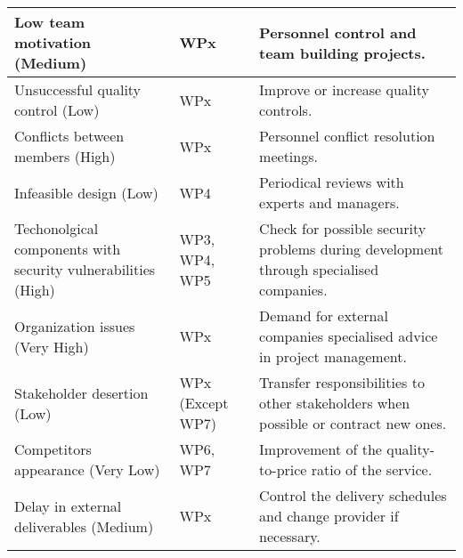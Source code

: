 \begin{longtable}[H]{>{\raggedright\arraybackslash}p{4cm} p{4.7cm} p{5cm}}
	Low team motivation (Medium) & WPx & Personnel control and team building projects. \vspace{0.2cm} \\
	
	\midrule
	
	Unsuccessful quality control (Low) & WPx & Improve or increase quality controls. \vspace{0.2cm} \\
	
	\midrule
	
	Conflicts between members  (High) & WPx & Personnel conflict resolution meetings. \vspace{0.2cm} \\
	
	\midrule
	
	Infeasible design (Low) & WP4 & Periodical reviews with experts and managers. \vspace{0.2cm} \\
	
	\midrule
	
	Techonolgical components with security vulnerabilities (High) & WP3, WP4, WP5 & Check for possible security problems during development through specialised companies. \vspace{0.2cm} \\
	
	\midrule
	
	Organization issues (Very High) & WPx & Demand for external companies specialised advice in project management. \vspace{0.2cm} \\
	
	\midrule
	
	Stakeholder desertion (Low) & WPx (Except WP7) & Transfer responsibilities to other stakeholders when possible or contract new ones. \vspace{0.2cm} \\
	
	\midrule
	
	Competitors appearance (Very Low) & WP6, WP7 & Improvement of the quality-to-price ratio of the service. \vspace{0.2cm} \\
	
	\midrule
	
	Delay in external deliverables (Medium) & WPx & Control the delivery schedules and change provider if necessary. \vspace{0.2cm} \\
	

\end{longtable}
